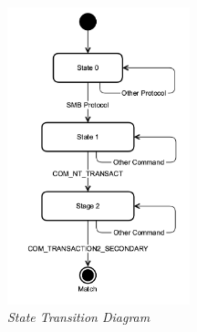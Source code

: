 \begin{figure}[H]
	\centering
	\includegraphics[width=200px]{resources/ngfilter_state_diagram.png}
	\caption{\textit{State Transition Diagram}}
	\label{fig:state_transition_diagram}
\end{figure}
